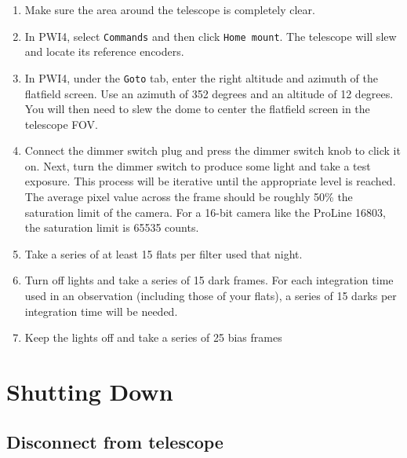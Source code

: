 \documentclass{article}
\begin{document}
	\begin{enumerate}
		
		\item Make sure the area around the telescope is completely clear.
		
		\item In PWI4, select \texttt{Commands} and then click \texttt{Home mount}. The telescope will slew and locate its reference encoders.
		
		\item In PWI4, under the \texttt{Goto} tab, enter the right altitude and azimuth of the flatfield screen. Use an azimuth of 352 degrees and an altitude of 12 degrees. You will then need to slew the dome to center the flatfield screen in the telescope FOV.
		
		\item Connect the dimmer switch plug and press the dimmer switch knob to click it on. Next, turn the dimmer switch to produce some light and take a test exposure. This process will be iterative until the appropriate level is reached. The average pixel value across the frame should be roughly 50\% the saturation limit of the camera. For a 16-bit camera like the ProLine 16803, the saturation limit is 65535 counts.
		
		\item Take a series of at least 15 flats per filter used that night.
		
		\item Turn off lights and take a series of 15 dark frames. For each integration time used in an observation (including those of your flats), a series of 15 darks per integration time will be needed.
		
		\item Keep the lights off and take a series of 25 bias frames
		
	\end{enumerate}
	
	\newpage
	\section{Shutting Down}
	
	\subsection{Disconnect from telescope}
	
\end{document}
